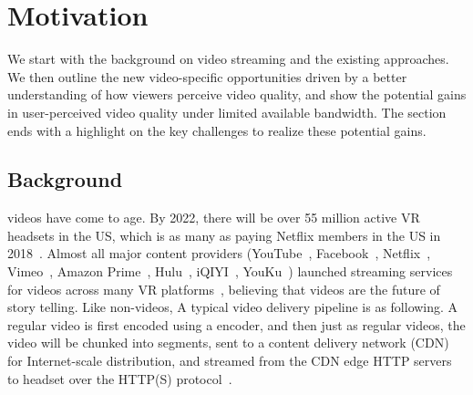 
\section{Motivation}

We start with the background on \vr video streaming and the existing approaches.
We then outline the new \vr video-specific opportunities driven by a better understanding of how viewers perceive \vr video quality, and show the potential gains in user-perceived \vr video quality under limited available bandwidth. 
The section ends with a highlight on the key challenges to realize these potential gains.


\subsection{Background}

\vr videos have come to age.
By 2022, there will be over 55 million active VR headsets in the US, which is as many as paying Netflix members in the US in 2018~\cite{https://qz.com/1298512/vr-could-be-as-big-in-the-us-as-netflix-in-five-years-study-shows/}.
Almost all major content providers (YouTube~\cite{??}, Facebook~\cite{??}, Netflix~\cite{??}, Vimeo~\cite{??}, Amazon Prime~\cite{??}, Hulu~\cite{??}, iQIYI~\cite{??}, YouKu~\cite{??}) launched streaming services for \vr videos across many VR platforms~\cite{oculus,samsung,daydreams,etc}, believing that \vr videos are the future of story telling. 
Like non-\vr videos, 
A typical \vr video delivery pipeline is as following. 
A regular video is first encoded using a \vr encoder, and then just as regular videos, the \vr video will be chunked into segments, sent to a content delivery network (CDN) for Internet-scale distribution, and streamed from the CDN edge HTTP servers to \vr headset over the HTTP(S) protocol~\cite{hls,https://www.wowza.com/solutions/streaming-types/virtual-reality-and-360-degree-streaming}.


